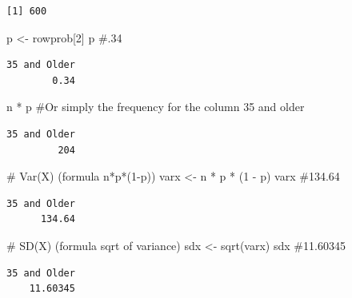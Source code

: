 \documentclass[
  letterpaper,
  DIV=11,
  numbers=noendperiod]{scrreprt}
\newenvironment{Shaded}{\begin{snugshade}}{\end{snugshade}}
\newcommand{\CommentTok}[1]{\textcolor[rgb]{0.37,0.37,0.37}{#1}}
\newcommand{\DecValTok}[1]{\textcolor[rgb]{0.68,0.00,0.00}{#1}}
\newcommand{\FunctionTok}[1]{\textcolor[rgb]{0.28,0.35,0.67}{#1}}
\newcommand{\NormalTok}[1]{\textcolor[rgb]{0.00,0.23,0.31}{#1}}
\newcommand{\OtherTok}[1]{\textcolor[rgb]{0.00,0.23,0.31}{#1}}
\newcommand{\SpecialCharTok}[1]{\textcolor[rgb]{0.37,0.37,0.37}{#1}}
\begin{document}
\begin{verbatim}
[1] 600
\end{verbatim}

\begin{Shaded}
\begin{Highlighting}[]
\NormalTok{p }\OtherTok{\textless{}{-}}\NormalTok{ rowprob[}\DecValTok{2}\NormalTok{]}
\NormalTok{p  }\CommentTok{\#.34}
\end{Highlighting}
\end{Shaded}

\begin{verbatim}
35 and Older 
        0.34 
\end{verbatim}

\begin{Shaded}
\begin{Highlighting}[]
\NormalTok{n }\SpecialCharTok{*}\NormalTok{ p  }\CommentTok{\#Or simply the frequency for the column 35 and older}
\end{Highlighting}
\end{Shaded}

\begin{verbatim}
35 and Older 
         204 
\end{verbatim}

\begin{Shaded}
\begin{Highlighting}[]
\CommentTok{\# Var(X) (formula n*p*(1{-}p))}
\NormalTok{varx }\OtherTok{\textless{}{-}}\NormalTok{ n }\SpecialCharTok{*}\NormalTok{ p }\SpecialCharTok{*}\NormalTok{ (}\DecValTok{1} \SpecialCharTok{{-}}\NormalTok{ p)}
\NormalTok{varx  }\CommentTok{\#134.64}
\end{Highlighting}
\end{Shaded}

\begin{verbatim}
35 and Older 
      134.64 
\end{verbatim}

\begin{Shaded}
\begin{Highlighting}[]
\CommentTok{\# SD(X) (formula sqrt of variance)}
\NormalTok{sdx }\OtherTok{\textless{}{-}} \FunctionTok{sqrt}\NormalTok{(varx)}
\NormalTok{sdx  }\CommentTok{\#11.60345 }
\end{Highlighting}
\end{Shaded}

\begin{verbatim}
35 and Older 
    11.60345 
\end{verbatim}
\end{document}
